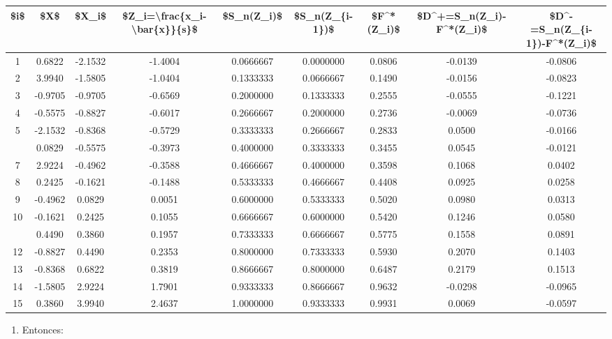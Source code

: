 \documentclass[
  a4paper,
  oneside,
  openany]{book}
\providecommand{\tightlist}{%
  \setlength{\itemsep}{0pt}\setlength{\parskip}{0pt}}
\begin{document}
\begin{table}
\centering
\begin{tabular}{ccccccccc}
\toprule
\$i\$ & \$X\$ & \$X\_i\$ & \$Z\_i=\textbackslash{}frac\{x\_i-\textbackslash{}bar\{x\}\}\{s\}\$ & \$S\_n(Z\_i)\$ & \$S\_n(Z\_\{i-1\})\$ & \$F\textasciicircum{}*(Z\_i)\$ & \$D\textasciicircum{}+=S\_n(Z\_i)-F\textasciicircum{}*(Z\_i)\$ & \$D\textasciicircum{}-=S\_n(Z\_\{i-1\})-F\textasciicircum{}*(Z\_i)\$\\
\midrule
1 & 0.6822 & -2.1532 & -1.4004 & 0.0666667 & 0.0000000 & 0.0806 & -0.0139 & -0.0806\\
2 & 3.9940 & -1.5805 & -1.0404 & 0.1333333 & 0.0666667 & 0.1490 & -0.0156 & -0.0823\\
3 & -0.9705 & -0.9705 & -0.6569 & 0.2000000 & 0.1333333 & 0.2555 & -0.0555 & -0.1221\\
4 & -0.5575 & -0.8827 & -0.6017 & 0.2666667 & 0.2000000 & 0.2736 & -0.0069 & -0.0736\\
5 & -2.1532 & -0.8368 & -0.5729 & 0.3333333 & 0.2666667 & 0.2833 & 0.0500 & -0.0166\\
\addlinespace
6 & 0.0829 & -0.5575 & -0.3973 & 0.4000000 & 0.3333333 & 0.3455 & 0.0545 & -0.0121\\
7 & 2.9224 & -0.4962 & -0.3588 & 0.4666667 & 0.4000000 & 0.3598 & 0.1068 & 0.0402\\
8 & 0.2425 & -0.1621 & -0.1488 & 0.5333333 & 0.4666667 & 0.4408 & 0.0925 & 0.0258\\
9 & -0.4962 & 0.0829 & 0.0051 & 0.6000000 & 0.5333333 & 0.5020 & 0.0980 & 0.0313\\
10 & -0.1621 & 0.2425 & 0.1055 & 0.6666667 & 0.6000000 & 0.5420 & 0.1246 & 0.0580\\
\addlinespace
11 & 0.4490 & 0.3860 & 0.1957 & 0.7333333 & 0.6666667 & 0.5775 & 0.1558 & 0.0891\\
12 & -0.8827 & 0.4490 & 0.2353 & 0.8000000 & 0.7333333 & 0.5930 & 0.2070 & 0.1403\\
13 & -0.8368 & 0.6822 & 0.3819 & 0.8666667 & 0.8000000 & 0.6487 & 0.2179 & 0.1513\\
14 & -1.5805 & 2.9224 & 1.7901 & 0.9333333 & 0.8666667 & 0.9632 & -0.0298 & -0.0965\\
15 & 0.3860 & 3.9940 & 2.4637 & 1.0000000 & 0.9333333 & 0.9931 & 0.0069 & -0.0597\\
\bottomrule
\end{tabular}
\end{table}

\begin{enumerate}
\def\labelenumi{\arabic{enumi})}
\setcounter{enumi}{8}
\tightlist
\item
  Entonces:
\end{enumerate}
\end{document}
